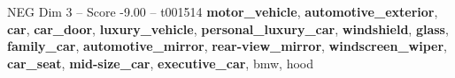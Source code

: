 \begin{textsample}{NEG Dim 3 – Score -9.00 – t001514}  \label{ex:f3_neg_009}
\textbf{motor\_vehicle}, \textbf{automotive\_exterior}, \textbf{car}, \textbf{car\_door}, \textbf{luxury\_vehicle}, \textbf{personal\_luxury\_car}, \textbf{windshield}, \textbf{glass}, \textbf{family\_car}, \textbf{automotive\_mirror}, \textbf{rear-view\_mirror}, \textbf{windscreen\_wiper}, \textbf{car\_seat}, \textbf{mid-size\_car}, \textbf{executive\_car}, bmw, hood

\end{textsample}

